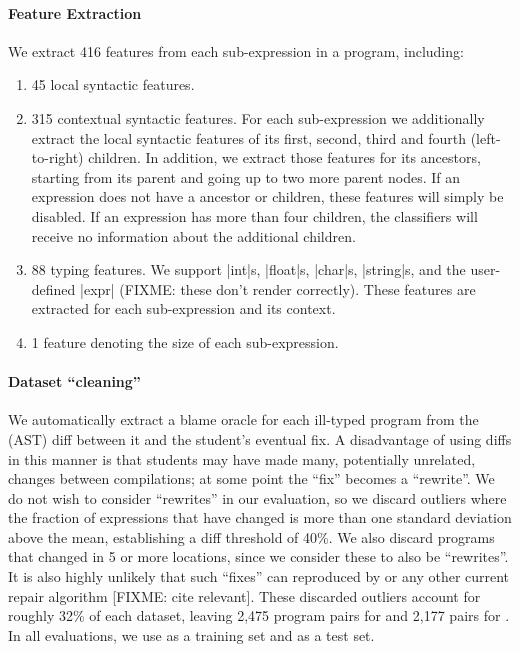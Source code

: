 \paragraph{Feature Extraction}
We extract 416 features from each sub-expression in a
program, including:
%
\begin{enumerate}
  \item 45 local syntactic features.
  \item 315 contextual syntactic features. For each sub-expression we
    additionally extract the local syntactic features of its first, second,
    third and fourth (left-to-right) children. In addition, we extract those
    features for its ancestors, starting from its parent and going up to two
    more parent nodes. If an expression does not have a ancestor or children,
    these features will simply be disabled. If an expression has more than four
    children, the classifiers will receive no information about the additional
    children.
  \item 88 typing features. We support |int|s, |float|s, |char|s, |string|s, and
    the user-defined |expr| (FIXME: these don't render correctly). These
    features are extracted for each
    sub-expression and its context.
  \item 1 feature denoting the size of each sub-expression.
\end{enumerate}

\paragraph{Dataset ``cleaning''}
We automatically extract a blame oracle for each ill-typed program from the
(AST) diff between it and the student's eventual fix. A disadvantage of using
diffs in this manner is that students may have made many, potentially unrelated,
changes between compilations; at some point the ``fix'' becomes a ``rewrite''.
We do not wish to consider ``rewrites'' in our evaluation, so we discard
outliers where the fraction of expressions that have changed is more than one
standard deviation above the mean, establishing a diff threshold of 40\%. We
also discard programs that changed in 5 or more locations, since we consider
these to also be ``rewrites''. It
is also highly unlikely that such ``fixes'' can reproduced by \toolname or any
other current repair algorithm [FIXME: cite relevant].
These discarded outliers account for
roughly 32\% of each dataset, leaving 2,475 program pairs for \SPRING
and 2,177 pairs for \FALL. In all evaluations, we use \SPRING as a training
set and \FALL as a test set.

